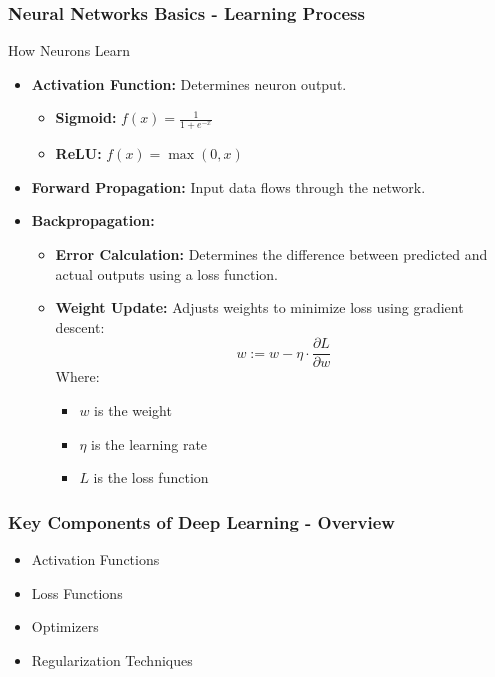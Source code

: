\documentclass[aspectratio=169]{beamer}
\begin{document}
\begin{frame}[fragile]
    \frametitle{Neural Networks Basics - Learning Process}
    \begin{block}{How Neurons Learn}
        \begin{itemize}
            \item \textbf{Activation Function:} Determines neuron output.
            \begin{itemize}
                \item \textbf{Sigmoid:}  $ f(x) = \frac{1}{1 + e^{-x}} $
                \item \textbf{ReLU:}  $ f(x) = \max(0, x) $
            \end{itemize}
            \item \textbf{Forward Propagation:} Input data flows through the network.
            \item \textbf{Backpropagation:} 
            \begin{itemize}
                \item \textbf{Error Calculation:} Determines the difference between predicted and actual outputs using a loss function.
                \item \textbf{Weight Update:} Adjusts weights to minimize loss using gradient descent:
                \begin{equation}
                    w := w - \eta \cdot \frac{\partial L}{\partial w}
                \end{equation}
                Where:
                \begin{itemize}
                    \item \( w \) is the weight
                    \item \( \eta \) is the learning rate
                    \item \( L \) is the loss function
                \end{itemize}
            \end{itemize}
        \end{itemize}
    \end{block}
\end{frame}

\begin{frame}[fragile]
    \frametitle{Key Components of Deep Learning - Overview}
    \begin{itemize}
        \item Activation Functions
        \item Loss Functions
        \item Optimizers
        \item Regularization Techniques
    \end{itemize}
\end{frame}
\end{document}
